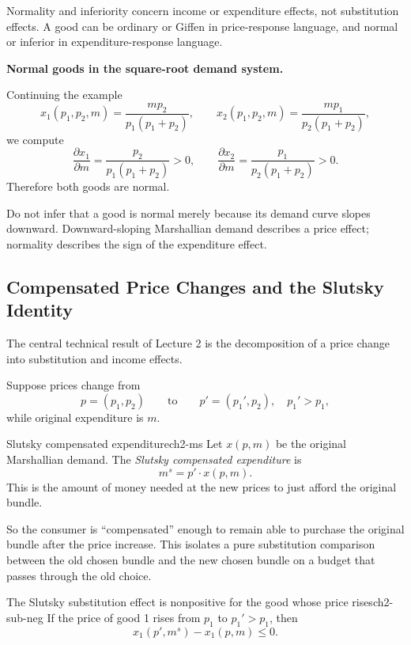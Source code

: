 Normality and inferiority concern income or expenditure effects, not substitution effects. A good can be ordinary or Giffen in price-response language, and normal or inferior in expenditure-response language.

\begin{examplebox}
\textbf{Normal goods in the square-root demand system.}

Continuing the example
\[
x_1(p_1,p_2,m)=\frac{m p_2}{p_1(p_1+p_2)},
\qquad
x_2(p_1,p_2,m)=\frac{m p_1}{p_2(p_1+p_2)},
\]
we compute
\[
\frac{\partial x_1}{\partial m}=\frac{p_2}{p_1(p_1+p_2)}>0,
\qquad
\frac{\partial x_2}{\partial m}=\frac{p_1}{p_2(p_1+p_2)}>0.
\]
Therefore both goods are normal.
\end{examplebox}

\begin{commonmistake}
Do not infer that a good is normal merely because its demand curve slopes downward. Downward-sloping Marshallian demand describes a price effect; normality describes the sign of the expenditure effect.
\end{commonmistake}

\subsection{Compensated Price Changes and the Slutsky Identity}

The central technical result of Lecture 2 is the decomposition of a price change into substitution and income effects.

Suppose prices change from
\[
p=(p_1,p_2)
\qquad \text{to} \qquad
p'=(p_1',p_2),
\quad p_1' > p_1,
\]
while original expenditure is $m$.

\begin{definition}{Slutsky compensated expenditure}{ch2-ms}
Let $x(p,m)$ be the original Marshallian demand. The \emph{Slutsky compensated expenditure} is
\[
m^s = p' \cdot x(p,m).
\]
This is the amount of money needed at the new prices to just afford the original bundle.
\end{definition}

So the consumer is ``compensated'' enough to remain able to purchase the original bundle after the price increase. This isolates a pure substitution comparison between the old chosen bundle and the new chosen bundle on a budget that passes through the old choice.

\begin{theorem}{The Slutsky substitution effect is nonpositive for the good whose price rises}{ch2-sub-neg}
If the price of good 1 rises from $p_1$ to $p_1' > p_1$, then
\[
x_1(p',m^s) - x_1(p,m) \le 0.
\]
\end{theorem}


